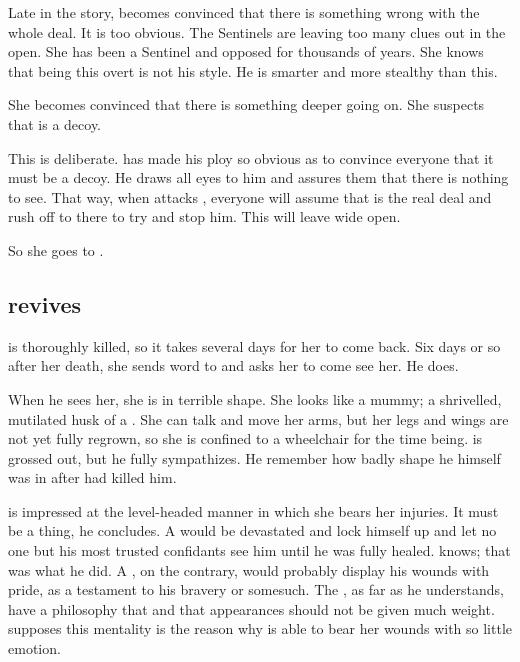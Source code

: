 Late in the story, \Achsah{} becomes convinced that there is something wrong with the whole \Malcur deal. 
It is too obvious. 
The Sentinels are leaving too many clues out in the open. 
She has been a Sentinel and opposed \Secherdamon{} for thousands of years. 
She knows that being this overt is not his style. 
He is smarter and more stealthy than this. 

She becomes convinced that there is something deeper going on. 
She suspects that \Malcur is a decoy. 

This is deliberate. 
\Secherdamon{} has made his \Malcur ploy so obvious as to convince everyone that it must be a decoy. 
He draws all eyes to him and assures them that there is nothing to see. 
That way, when \Nzessuacrith{} attacks \Forclin, everyone will assume that \Forclin{} is the real deal and rush off to there to try and stop him. 
This will leave \Malcur wide open. 

So she goes to \Forclin. 









\subsection{\Urizeth revives}
\Urizeth{} is thoroughly killed, so it takes several days for her to come back. 
Six days or so after her death, she sends word to \Teshrial{} and asks her to come see her. 
He does. 

When he sees her, she is in terrible shape. 
She looks like a mummy; a shrivelled, mutilated husk of a \resvil. 
She can talk and move her arms, but her legs and wings are not yet fully regrown, so she is confined to a wheelchair for the time being. 
\Teshrial{} is grossed out, but he fully sympathizes. 
He remember how badly shape he himself was in after \Ishnaruchaefir{} had killed him. 

\Teshrial is impressed at the level-headed manner in which she bears her injuries. 
It must be a \TiphredSerah thing, he concludes. 
A \CiriathSepher would be devastated and lock himself up and let no one but his most trusted confidants see him until he was fully healed. 
\Teshrial knows; that was what he did.
A \Mystraacht, on the contrary, would probably display his wounds with pride, as a testament to his bravery or somesuch. 
The \TiphredSerah, as far as he understands, have a philosophy that  and that appearances should not be given much weight. 
\Teshrial supposes this mentality is the reason why \Urizeth is able to bear her wounds with so little emotion. 

